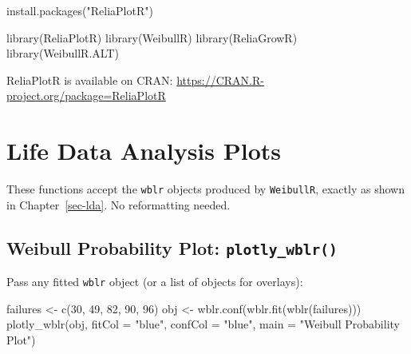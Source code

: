 \documentclass[
  letterpaper,
  DIV=11,
  numbers=noendperiod]{scrreprt}
\newenvironment{Shaded}{\begin{snugshade}}{\end{snugshade}}
\newcommand{\AttributeTok}[1]{\textcolor[rgb]{0.40,0.45,0.13}{#1}}
\newcommand{\DecValTok}[1]{\textcolor[rgb]{0.68,0.00,0.00}{#1}}
\newcommand{\FunctionTok}[1]{\textcolor[rgb]{0.28,0.35,0.67}{#1}}
\newcommand{\NormalTok}[1]{\textcolor[rgb]{0.00,0.23,0.31}{#1}}
\newcommand{\OtherTok}[1]{\textcolor[rgb]{0.00,0.23,0.31}{#1}}
\newcommand{\StringTok}[1]{\textcolor[rgb]{0.13,0.47,0.30}{#1}}
\begin{document}
\begin{Shaded}
\begin{Highlighting}[]
\FunctionTok{install.packages}\NormalTok{(}\StringTok{"ReliaPlotR"}\NormalTok{)}
\end{Highlighting}
\end{Shaded}

\begin{Shaded}
\begin{Highlighting}[]
\FunctionTok{library}\NormalTok{(ReliaPlotR)}
\FunctionTok{library}\NormalTok{(WeibullR)}
\FunctionTok{library}\NormalTok{(ReliaGrowR)}
\FunctionTok{library}\NormalTok{(WeibullR.ALT)}
\end{Highlighting}
\end{Shaded}

ReliaPlotR is available on CRAN:
\url{https://CRAN.R-project.org/package=ReliaPlotR}

\section{Life Data Analysis Plots}\label{life-data-analysis-plots}

These functions accept the \texttt{wblr} objects produced by
\texttt{WeibullR}, exactly as shown in Chapter~\ref{sec-lda}. No
reformatting needed.

\subsection{\texorpdfstring{Weibull Probability Plot:
\texttt{plotly\_wblr()}}{Weibull Probability Plot: plotly\_wblr()}}\label{weibull-probability-plot-plotly_wblr}

Pass any fitted \texttt{wblr} object (or a list of objects for
overlays):

\begin{Shaded}
\begin{Highlighting}[]
\NormalTok{failures }\OtherTok{\textless{}{-}} \FunctionTok{c}\NormalTok{(}\DecValTok{30}\NormalTok{, }\DecValTok{49}\NormalTok{, }\DecValTok{82}\NormalTok{, }\DecValTok{90}\NormalTok{, }\DecValTok{96}\NormalTok{)}
\NormalTok{obj }\OtherTok{\textless{}{-}} \FunctionTok{wblr.conf}\NormalTok{(}\FunctionTok{wblr.fit}\NormalTok{(}\FunctionTok{wblr}\NormalTok{(failures)))}
\FunctionTok{plotly\_wblr}\NormalTok{(obj, }\AttributeTok{fitCol =} \StringTok{"blue"}\NormalTok{, }\AttributeTok{confCol =} \StringTok{"blue"}\NormalTok{,}
            \AttributeTok{main =} \StringTok{"Weibull Probability Plot"}\NormalTok{)}
\end{Highlighting}
\end{Shaded}
\end{document}
